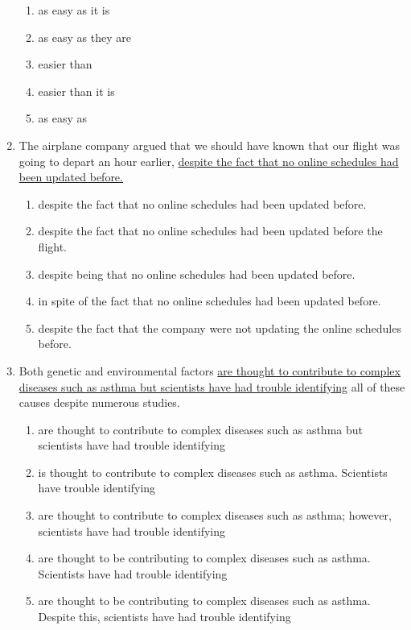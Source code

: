 \begin{enumerate}[resume]
\begin{enumerate}[label=(\Alph*)]
\item as easy as it is
\item as easy as they are
\item easier than 
\item easier than it is
\item as easy as
\end{enumerate}

\bigskip
\item The airplane company argued that we should have known that our flight was going to depart an hour earlier, \ul{despite the fact that no online schedules had been updated before.}

\begin{enumerate}[label=(\Alph*)]
\item despite the fact that no online schedules had been updated before.
\item despite the fact that no online schedules had been updated before the flight. 
\item despite being that no online schedules had been updated before.
\item in spite of the fact that no online schedules had been updated before.
\item despite the fact that the company were not updating the online schedules before. 
\end{enumerate}

\newpage
\item Both genetic and environmental factors \ul{are thought to contribute to complex diseases such as asthma but scientists have had trouble identifying} all of these causes despite numerous studies. 

\begin{enumerate}[label=(\Alph*)]
\item are thought to contribute to complex diseases such as asthma but scientists have had trouble identifying
\item is thought to contribute to complex diseases such as asthma. Scientists have trouble identifying    
\item are thought to contribute to complex diseases such as asthma; however, scientists have had trouble identifying
\item are thought to be contributing to complex diseases such as asthma. Scientists have had trouble identifying
\item are thought to be contributing to complex diseases such as asthma. Despite this, scientists have had trouble identifying
\end{enumerate}


\end{enumerate}
